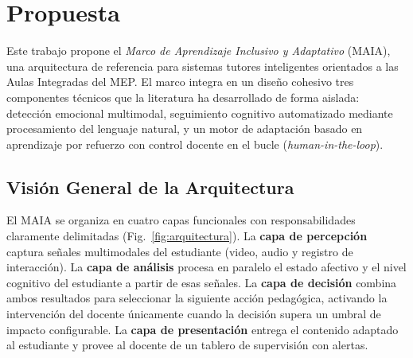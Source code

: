 \section{Propuesta}

Este trabajo propone el \textit{Marco de Aprendizaje Inclusivo y Adaptativo}
(MAIA), una arquitectura de referencia para sistemas tutores inteligentes
orientados a las Aulas Integradas del MEP. El marco integra en un diseño
cohesivo tres componentes técnicos que la literatura ha desarrollado de
forma aislada: detección emocional multimodal, seguimiento cognitivo
automatizado mediante procesamiento del lenguaje natural, y un motor de
adaptación basado en aprendizaje por refuerzo con control docente en el
bucle (\textit{human-in-the-loop}).

\subsection{Visión General de la Arquitectura}

El MAIA se organiza en cuatro capas funcionales con responsabilidades
claramente delimitadas (Fig.~\ref{fig:arquitectura}). La \textbf{capa de
percepción} captura señales multimodales del estudiante (video, audio y
registro de interacción). La \textbf{capa de análisis} procesa en paralelo
el estado afectivo y el nivel cognitivo del estudiante a partir de esas
señales. La \textbf{capa de decisión} combina ambos resultados para
seleccionar la siguiente acción pedagógica, activando la intervención del
docente únicamente cuando la decisión supera un umbral de impacto
configurable. La \textbf{capa de presentación} entrega el contenido
adaptado al estudiante y provee al docente de un tablero de supervisión
con alertas.


